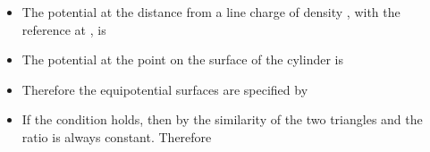 \begin{ELunit}

\begin{itemize}
\tightlist
\item
  The potential at the distance  from a line charge of density \ELim{\rho_\ell}, with the reference at , is
\end{itemize}


\begin{itemize}
\tightlist
\item
  The potential at the point  on the surface of the cylinder is
\end{itemize}


\begin{itemize}
\tightlist
\item
  Therefore the equipotential surfaces are specified by
\end{itemize}



\end{ELunit}

\begin{ELjoin}

\begin{itemize}
\tightlist
\item
  If the condition  holds, then by the similarity of the two triangles  and  the ratio  is always constant. Therefore
\end{itemize}

\begin{ELimportant}{}


\end{ELimportant}

\end{ELjoin}

